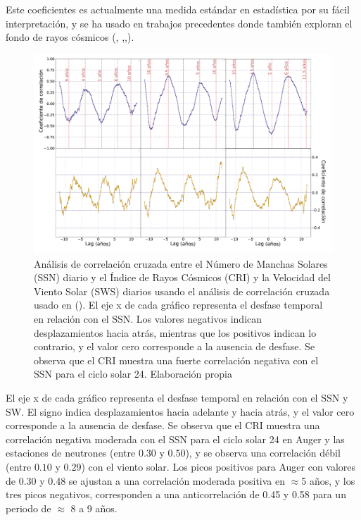 Este coeficientes es actualmente una medida estándar en estadística por su fácil interpretación, y se ha usado en trabajos precedentes donde también exploran el fondo de rayos cósmicos (\cite{Usoskin_2005}, \cite{Oloketuyi_2020},\cite{Mendonça_2019},\cite{Davies_2023}).
\begin{figure}
    \includegraphics[width=1.0\linewidth]{Figs/Figr/09_cross_correlation.pdf}
    \caption{Análisis de correlación cruzada entre el Número de Manchas Solares (SSN) diario y el Índice de Rayos Cósmicos (CRI) y la Velocidad del Viento Solar (SWS) diarios usando el análisis de correlación cruzada usado en (\cite{Oloketuyi_2020}). El eje x de cada gráfico representa el desfase temporal en relación con el SSN. Los valores negativos indican desplazamientos hacia atrás, mientras que los positivos indican lo contrario, y el valor cero corresponde a la ausencia de desfase. Se observa que el CRI muestra una fuerte correlación negativa con el SSN para el ciclo solar 24. Elaboración propia}
    \label{fig:sunspots_corr}
\end{figure}
El eje x de cada gráfico representa el desfase temporal en relación con el SSN y SW. El signo indica desplazamientos hacia adelante y hacia atrás, y el valor cero corresponde a la ausencia de desfase. Se observa que el CRI muestra una correlación negativa moderada con el SSN para el ciclo solar 24 en Auger y las estaciones de neutrones (entre $0.30$ y $0.50$), y se observa una correlación débil (entre $0.10$ y $0.29$) con el viento solar. Los picos positivos para Auger con valores de 0.30 y 0.48 se ajustan a una correlación moderada positiva en $\approx$5 años, y los tres picos negativos, corresponden a una anticorrelación de 0.45 y 0.58 para un periodo de $\approx$ 8 a 9 años.
